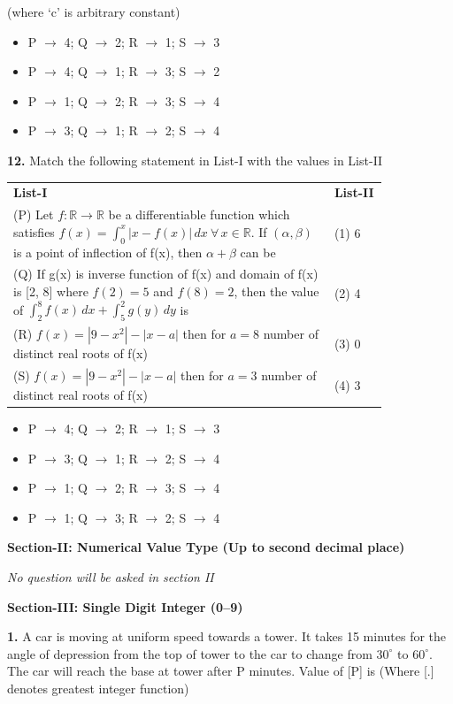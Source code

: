 \documentclass[10pt,twocolumn]{extarticle}
\renewcommand{\arraystretch}{1.15}
\newenvironment{qoptions}{\begin{itemize}[leftmargin=1.8em,itemsep=2pt,topsep=2pt,label={}]}{\end{itemize}}
\newcommand{\opt}[2]{\item[({#1})] {#2}}
\newcommand{\subsectionhdr}[1]{\par\vspace{3pt}\noindent\textbf{#1}\par\vspace{2pt}}
\begin{document}
(where `c' is arbitrary constant)

\begin{qoptions}
\opt{A}{P $\to$ 4; Q $\to$ 2; R $\to$ 1; S $\to$ 3}
\opt{B}{P $\to$ 4; Q $\to$ 1; R $\to$ 3; S $\to$ 2}
\opt{C}{P $\to$ 1; Q $\to$ 2; R $\to$ 3; S $\to$ 4}
\opt{D}{P $\to$ 3; Q $\to$ 1; R $\to$ 2; S $\to$ 4}
\end{qoptions}

\textbf{12.} Match the following statement in List-I with the values in List-II

\begin{center}
\renewcommand{\arraystretch}{1.5}
\begin{tabular}{@{}p{0.72\linewidth}p{0.12\linewidth}@{}}
\textbf{List-I} & \textbf{List-II}\\
(P) Let $f:\mathbb{R}\to\mathbb{R}$ be a differentiable function which satisfies $f(x)=\displaystyle\int_0^x|x-f(x)|\,dx\ \forall\, x\in\mathbb{R}$. If $(\alpha,\beta)$ is a point of inflection of f(x), then $\alpha+\beta$ can be & (1) 6\\
(Q) If g(x) is inverse function of f(x) and domain of f(x) is [2, 8] where $f(2)=5$ and $f(8)=2$, then the value of $\displaystyle\int_2^8 f(x)\,dx+\int_5^2 g(y)\,dy$ is & (2) 4\\
(R) $f(x)=|9-x^2|-|x-a|$ then for $a=8$ number of distinct real roots of f(x) & (3) 0\\
(S) $f(x)=|9-x^2|-|x-a|$ then for $a=3$ number of distinct real roots of f(x) & (4) 3\\
\end{tabular}
\renewcommand{\arraystretch}{1.15}
\end{center}

\begin{qoptions}
\opt{A}{P $\to$ 4; Q $\to$ 2; R $\to$ 1; S $\to$ 3}
\opt{B}{P $\to$ 3; Q $\to$ 1; R $\to$ 2; S $\to$ 4}
\opt{C}{P $\to$ 1; Q $\to$ 2; R $\to$ 3; S $\to$ 4}
\opt{D}{P $\to$ 1; Q $\to$ 3; R $\to$ 2; S $\to$ 4}
\end{qoptions}

\subsectionhdr{Section-II: Numerical Value Type (Up to second decimal place)}

\textit{No question will be asked in section II}

\subsectionhdr{Section-III: Single Digit Integer (0--9)}

\textbf{1.} A car is moving at uniform speed towards a tower. It takes 15 minutes for the angle of depression from the top of tower to the car to change from $30^\circ$ to $60^\circ$. The car will reach the base at tower after P minutes. Value of [P] is (Where [.] denotes greatest integer function)
\end{document}
